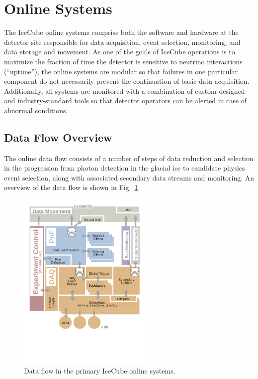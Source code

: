 
\section{\label{sect:online}Online Systems}

The IceCube online systems comprise both the software and hardware
at the detector site responsible for data acquisition, event selection,
monitoring, and data storage and movement.  As one of the goals of IceCube
operations is to maximize the fraction of time the detector is sensitive
to neutrino interactions (``uptime''), the online systems are modular so
that failures in one
particular component do not necessarily prevent the continuation of basic
data acquisition. Additionally, all systems are monitored with a combination of
custom-designed and industry-standard tools so that detector operators can
be alerted in case of abnormal conditions.

\subsection{\label{sect:online:dataflow}Data Flow Overview}

The online data flow consists of a number of steps of data reduction and
selection in the progression from photon detection in the glacial ice to
candidate physics event selection, along with associated secondary data
streams and monitoring.  An overview of the data flow is shown in
Fig.~\ref{fig:online_dataflow}.

\begin{figure}[!h]
 \centering
 \includegraphics[width=0.6\textwidth]{graphics/online/online_dataflow.pdf}
 \caption{Data flow in the primary IceCube online systems.}
 \label{fig:online_dataflow}
\end{figure}

